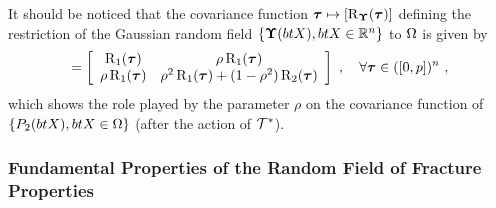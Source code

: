 It should be noticed that the covariance function $\boldsymbol{\tau} \mapsto [\operatorname{R}_{\boldsymbol{\Upsilon}}(\boldsymbol{\tau})]$ defining the restriction of the Gaussian random field $\{\boldsymbol{\Upsilon}(btX), btX \in \mathbb{R}^n\}$ to $\Omega$ is given by
\begin{align}
  [\cor_{\bs{\Upsilon}}(\bs{\tau})] = \left[\begin{array}{cc}\cor_1(\bs{\tau}) & \rho \cor_1(\bs{\tau}) \\\rho \cor_1(\bs{\tau}) & \rho^2 \cor_1(\bs{\tau}) + (1-\rho^2) \cor_2(\bs{\tau}) \end{array}\right]~, \quad \forall \bs{\tau} \in ([0,p])^n~,
\end{align}
which shows the role played by the parameter $\rho$ on the covariance function of $\{P_2(btX), btX \in \Omega\}$ (after the action of $\mathcal{T}^*$).

\subsubsection{Fundamental Properties of the Random Field of Fracture Properties}

